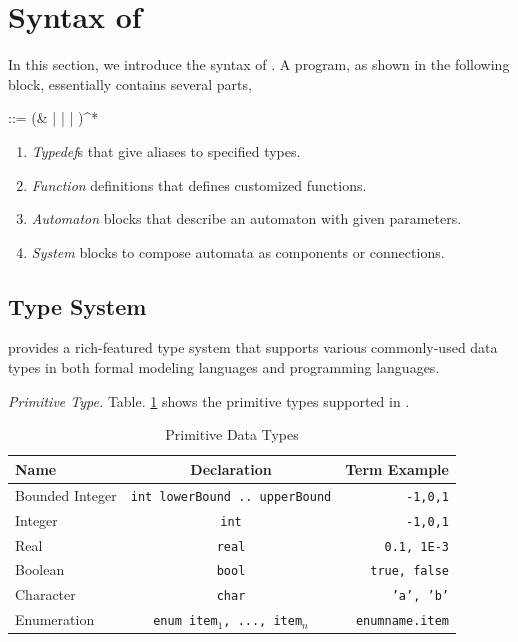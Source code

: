 \section{Syntax of \lang{}}
\label{sec:syntax}

In this section, we introduce the syntax of \lang{}. A \lang{} program, as shown in the following block, essentially contains several parts,
\begin{bnf}
     ::=  (&  |  |  | )^*
\end{bnf}

\begin{enumerate}
    \item \emph{Typedef}s that give aliases to specified types.
    \item \emph{Function} definitions that defines customized functions.
    \item \emph{Automaton} blocks that describe an automaton with given parameters.
    \item \emph{System} blocks to compose automata as components or connections.
\end{enumerate}

\subsection{Type System}
\label{subsec:typesystem}
\lang{} provides a rich-featured type system that supports various commonly-used data types in both formal modeling languages and programming languages.

\vspace{0.3em}
\noindent\emph{Primitive Type.} Table. \ref{table:primitivetypes} shows the primitive types supported in \lang{}.

\begin{table}
    \caption{Primitive Data Types}
    \label{table:primitivetypes}
    \centering
    \begin{tabular}{lcr}
        \hline
        Name & Declaration & Term Example \T\B \\
        \hline
        \T Bounded Integer\hspace{0.5cm} & \texttt{int lowerBound .. upperBound}\hspace{0.5cm} & \texttt{-1,0,1} \\
        Integer & \texttt{int} & \texttt{-1,0,1} \\
        Real & \texttt{real} & \texttt{0.1, 1E-3} \\
        Boolean & \texttt{bool} & \texttt{true, false} \\
        Character & \texttt{char} & \texttt{'a', 'b'} \\
        \B Enumeration & \texttt{enum {item$_1$, ..., item$_n$}} & \texttt{enumname.item} \\
        \hline
    \end{tabular}
\end{table}

